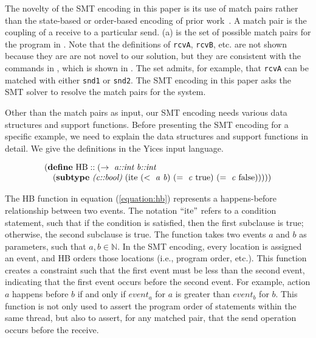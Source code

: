 The novelty of the SMT encoding in this paper is its use of match pairs rather than the state-based or order-based encoding of prior work~\cite{elwakil:padtad10,elwakil:atva10}. A match pair is the coupling of a receive to a particular send.  (a) is the set of possible match pairs for the program in . Note that the definitions of \texttt{rcvA}, \texttt{rcvB}, etc. are not shown because they are are not novel to our solution, but they are consistent with the commands in , which is shown in . The set admits, for example, that \texttt{rcvA} can be matched with either \texttt{snd1} or \texttt{snd2}. The SMT encoding in this paper asks the SMT solver to resolve the match pairs for the system.

Other than the match pairs as input, our SMT encoding needs various data structures and support functions. %
Before presenting the SMT encoding for a specific example, we need to explain the data structures and support functions in detail. We give the definitions in the Yices \cite{dutertre:CAV06} input language.

\begin{equation}
\begin{array}{l}
(\cfgt{define}\ \mathrm{HB}::(\rightarrow\ \cfgnt{a::int}\ \cfgnt{b::int}\\
\ \ \ (\cfgt{subtype}\ \cfgnt{(c::bool)}\ (\mathrm{ite}\ (<\ \mathit{a}\ \mathit{b})\ (=\ \mathit{c}\ \mathrm{true})\ (=\ \mathit{c}\ \mathrm{false})))))
\end{array}
\label{equation:hb}
\end{equation}


The HB function in equation (\ref{equation:hb}) represents a happens-before relationship between two events. The notation $``\mathrm{ite}"$ refers to a condition statement, such that if the condition is satisfied, then the first subclause is true; otherwise, the second subclause is true. The function takes two events $a$ and $b$ as parameters, such that $a,b \in \mathbb{N}$. In the SMT encoding, every location is assigned an event, and HB orders those locations (i.e., program order, etc.). This function creates a constraint such that the first event must be less than the second event, indicating that the first event occurs before the second event. For example, action $a$ happens before $b$ if and only if $\mathit{event}_a$ for $a$ is greater than $\mathit{event}_b$ for $b$. This function is not only used to assert the program order of statements within the same thread, but also to assert, for any matched pair, that the send operation
occurs before the receive.

